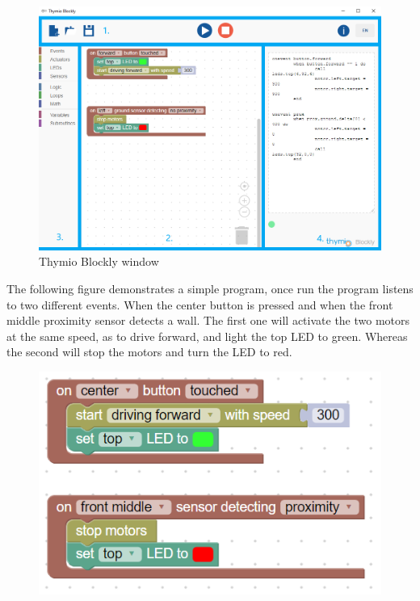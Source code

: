 \documentclass{scrartcl}
\begin{document}
\begin{figure}[h!]
  \includegraphics[width=\textwidth]{./Blockly/blockly_window}
  \caption{Thymio Blockly window}
  \label{fig:thymio_blockly_window}
\end{figure}

The following figure demonstrates a simple program, once run the program listens to two different events. When the center button is pressed and when the front middle proximity sensor detects a wall. 
The first one will activate the two motors at the same speed, as to drive forward, and light the top LED to green. Whereas the second will stop the motors and turn the LED to red.
\begin{figure}[h!]
  \includegraphics[width=\textwidth]{./Blockly/forward_stop_wall}
  \label{fig:thymio_blockly_basic_program}
\end{figure}
\end{document}
